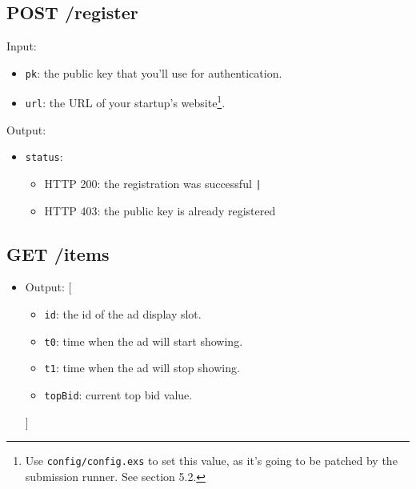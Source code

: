 \documentclass{article}
\begin{document}
\subsection{POST /register}
\begin{itemize}
    \item { Input: \begin{itemize}
        \item \texttt{pk}: the public key that you'll use for authentication.
        \item \texttt{url}: the URL of your startup's website\footnote{Use \texttt{config/config.exs} to set this value, as it's going to be patched by the submission runner. See section 5.2.}.
    \end{itemize}
    \item { Output:

        \begin{itemize}
            \item { \texttt{status}:
                \begin{itemize}
                    \item HTTP 200: the registration was successful \texttt{|}
                    \item HTTP 403: the public key is already registered
                \end{itemize}
            }
        \end{itemize}}

    }
\end{itemize}

\subsection{GET /items}
\begin{itemize}
    \item { Output: [

            \begin{itemize}
                \item \texttt{id}: the id of the ad display slot.
                \item \texttt{t0}: time when the ad will start showing.
                \item \texttt{t1}: time when the ad will stop showing.
                \item \texttt{topBid}: current top bid value.
            \end{itemize}

        ]
    }
\end{itemize}
\end{document}
